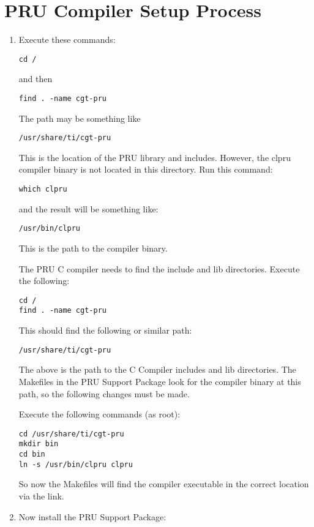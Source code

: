 \section{PRU Compiler Setup Process}
\begin{enumerate}
\item  Execute these commands:
  \begin{verbatim}
cd /
\end{verbatim} and then 
\begin{verbatim}
find . -name cgt-pru
\end{verbatim}

The path may be something like 
\begin{verbatim}
/usr/share/ti/cgt-pru
\end{verbatim}  

This is the location of the PRU library and includes.
However, the clpru compiler binary is not located in this directory.  Run this command:
\begin{verbatim}
which clpru
\end{verbatim}
and the result will be something like:
\begin{verbatim}
/usr/bin/clpru
\end{verbatim}
This is the path to the compiler binary.

The PRU C compiler needs to find the include and lib directories.  Execute the following:

\begin{verbatim}
cd /
find . -name cgt-pru
\end{verbatim}

This should find the following or similar path:

\begin{verbatim}
/usr/share/ti/cgt-pru
\end{verbatim}

The above is the path to the C Compiler includes and lib directories.  The Makefiles in the PRU Support Package look for the compiler binary at this path, so the following changes must be made.

Execute the following commands (as root):
\begin{verbatim}
cd /usr/share/ti/cgt-pru
mkdir bin
cd bin
ln -s /usr/bin/clpru clpru
\end{verbatim}
So now the Makefiles will find the compiler executable in the correct location via the link.
\item  Now install the PRU Support Package:


\end{enumerate}
